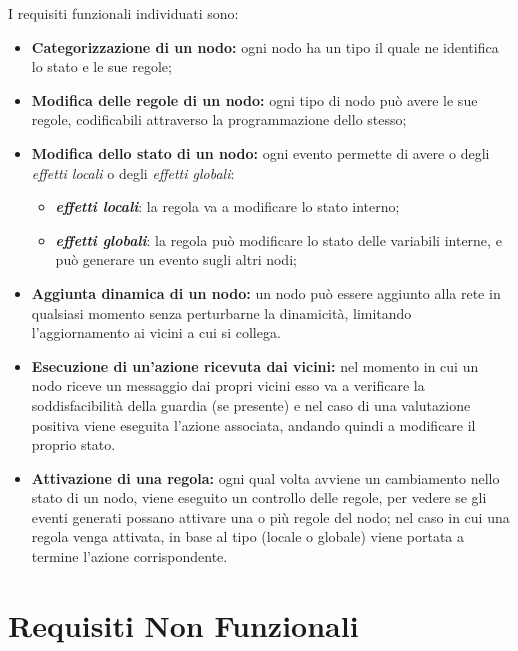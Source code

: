 \documentclass{memoir}
\begin{document}
I requisiti funzionali individuati sono:
\begin{itemize}
\item \textbf{Categorizzazione di un nodo:} ogni nodo ha un tipo il quale ne identifica
	   lo stato e le sue regole;
\item \textbf{Modifica delle regole di un nodo:} ogni tipo di nodo può avere le
	   sue regole, codificabili attraverso la programmazione dello stesso;
\item \textbf{Modifica dello stato di un nodo:} ogni evento permette di avere o degli
	   \textit{effetti locali} o degli \textit{effetti globali}:
	\begin{itemize}
	\item \textit{\textbf{effetti locali}}: la regola va a modificare lo stato interno;
	\item \textit{\textbf{effetti globali}}: la regola può modificare lo stato delle
	   variabili interne, e può generare un evento sugli altri nodi;
	\end{itemize}
\item \textbf{Aggiunta dinamica di un nodo:} un nodo può essere aggiunto alla rete
	   in qualsiasi momento senza perturbarne la dinamicità, limitando l'aggiornamento
	   ai vicini a cui si collega.
\item \textbf{Esecuzione di un'azione ricevuta dai vicini:} nel momento in cui un
	   nodo riceve un messaggio dai propri vicini esso va a verificare la soddisfacibilità
	   della guardia (se presente) e nel caso di una valutazione positiva viene eseguita
	   l'azione associata, andando quindi a modificare il proprio stato.
\item \textbf{Attivazione di una regola:} ogni qual volta avviene un cambiamento
	   nello stato di un nodo, viene eseguito un controllo delle regole, per vedere
	   se gli
	   eventi generati possano attivare una o più regole del nodo; nel caso in cui
	   una
	   regola venga attivata, in base al tipo (locale o globale) viene portata a termine
	   l'azione corrispondente.
\end{itemize}

\section{Requisiti Non Funzionali}
\end{document}
